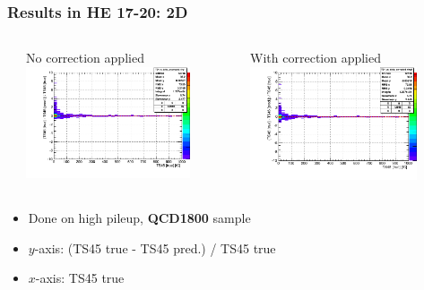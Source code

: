 \documentclass[bigger]{beamer}
\providecommand{\alert}[1]{\textbf{#1}}
\begin{document}
\begin{frame}
\frametitle{Results in HE 17-20: 2D}
\label{sec-3-3-6}
\begin{columns} %
\label{sec-3-3-6-1}
\begin{column}{0.55\textwidth}
\label{sec-3-3-6-1-1}

\centering
No correction applied
\includegraphics[width=0.8\textwidth]{fig/delta_uncorrected_QCD1800_ring_1.png}
\end{column}
\begin{column}{0.55\textwidth}
\label{sec-3-3-6-1-2}

\centering
With correction applied
\includegraphics[width=0.8\textwidth]{fig/delta_corrected_QCD1800_ring_1.png}
\end{column}
\end{columns}
\label{sec-3-3-6-2}
\begin{itemize}

\item Done on high pileup, \alert{QCD1800} sample
\label{sec-3-3-6-2-1}%

\item $y$-axis: (TS45 true - TS45 pred.) / TS45 true
\label{sec-3-3-6-2-2}%

\item $x$-axis: TS45 true
\label{sec-3-3-6-2-3}%

\end{itemize} %
\end{frame}
\end{document}
